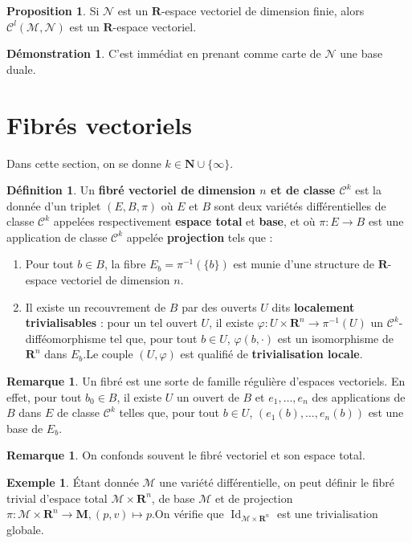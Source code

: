 \documentclass[12pt,a4paper]{article}
\DeclareMathOperator{\Id}{Id}
\theoremstyle{definition}
\newtheorem{prop}[thm]{Proposition}
\newtheorem{defn}[thm]{Définition}
\newtheorem{ex}[thm]{Exemple}
\newtheorem{rqe}[thm]{Remarque}
\newtheorem*{dem}{Démonstration}
\begin{document}
\begin{prop}
Si $\mathcal{N}$ est un $\mathbf{R}$-espace vectoriel de dimension finie, alors $\mathcal{C}^l\left(\mathcal{M},\mathcal{N}\right)$ est un $\mathbf{R}$-espace vectoriel.
\end{prop}
\begin{dem}
C'est immédiat en prenant comme carte de $\mathcal{N}$ une base duale.
\end{dem}
\newpage
\section{Fibrés vectoriels}
Dans cette section, on se donne $k\in\mathbf{N}\cup\{\infty\}$.
\begin{defn}
Un \textbf{fibré vectoriel de dimension $n$ et de classe $\mathcal{C}^k$} est la donnée d'un triplet $(E,B,\pi)$ où $E$ et $B$ sont deux variétés différentielles de classe $\mathcal{C}^k$ appelées respectivement \textbf{espace total} et \textbf{base}, et où $\pi: E\to B$ est une application de classe $\mathcal{C}^k$ appelée \textbf{projection} tels que :
\begin{enumerate}[label=\roman*)]
\item Pour tout $b\in B$, la fibre $E_b=\pi^{-1}(\{b\})$ est munie d'une structure de $\mathbf{R}$-espace vectoriel de dimension $n$.
\item Il existe un recouvrement de $B$ par des ouverts $U$ dits \textbf{localement trivialisables} : pour un tel ouvert $U$, il existe $\varphi:U\times\mathbf{R}^n\to \pi^{-1}(U)$ un $\mathcal{C}^k$-difféomorphisme tel que, pour tout $b\in U$, $\varphi(b,\cdot)$ est un isomorphisme de $\mathbf{R}^n$ dans $E_b$.\newline Le couple $(U,\varphi)$ est qualifié de \textbf{trivialisation locale}.
\end{enumerate}
\end{defn}
\begin{rqe}
Un fibré est une sorte de famille régulière d'espaces vectoriels. En effet, pour tout $b_0\in B$, il existe $U$ un ouvert de $B$ et $e_1,\ldots,e_n$ des applications de $B$ dans $E$ de classe $\mathcal{C}^k$ telles que, pour tout $b\in U$, $(e_1(b),\ldots,e_n(b))$ est une base de $E_b$.
\end{rqe}
\begin{rqe}
On confonds souvent le fibré vectoriel et son espace total.
\end{rqe}
\begin{ex}
Étant donnée $\mathcal{M}$ une variété différentielle, on peut définir le fibré trivial d'espace total $\mathcal{M}\times\mathbf{R}^n$, de base $\mathcal{M}$ et de projection $\pi:\mathcal{M}\times\mathbf{R}^n\to\mathbf{M},(p,v)\mapsto p$.\newline On vérifie que $\Id_{\mathcal{M}\times\mathbf{R}^n}$ est une trivialisation globale.
\end{ex}
\end{document}
